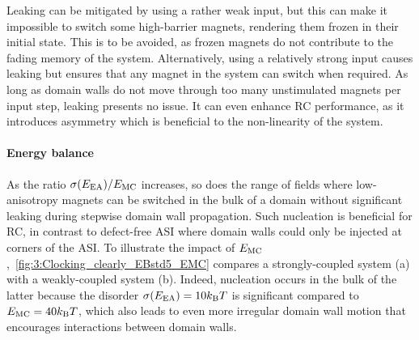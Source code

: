Leaking can be mitigated by using a rather weak input, but this can make it impossible to switch some high-barrier magnets, rendering them frozen in their initial state.
This is to be avoided, as frozen magnets do not contribute to the fading memory of the system.
Alternatively, using a relatively strong input causes leaking but ensures that any magnet in the system can switch when required.
As long as domain walls do not move through too many unstimulated magnets per input step, leaking presents no issue.
It can even enhance RC performance, as it introduces asymmetry which is beneficial to the non-linearity of the system.

\paragraph{Energy balance}
As the ratio $\sigma(E_\mathrm{EA}) / E_\mathrm{MC}$ increases, so does the range of fields where low-anisotropy magnets can be switched in the bulk of a domain without significant leaking during stepwise domain wall propagation.
Such nucleation is beneficial for RC, in contrast to defect-free ASI where domain walls could only be injected at corners of the ASI.
To illustrate the impact of $E_\mathrm{MC}$,~\cref{fig:3:Clocking_clearly_EBstd5_EMC} compares a strongly-coupled system (a) with a weakly-coupled system (b). %
Indeed, nucleation occurs in the bulk of the latter because the disorder $\sigma(\EEA) = 10 \kBT$ is significant compared to $\EMC = 40 \kBT$, which also leads to even more irregular domain wall motion that encourages interactions between domain walls.

